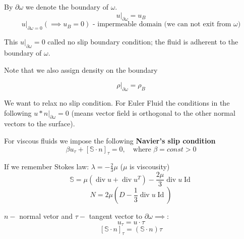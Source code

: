 \documentclass[12pt]{article}
\DeclareMathOperator{\Div}{div}
\DeclareMathOperator{\Id}{Id}
\begin{document}
By $\partial\omega$ we denote the boundary of $\omega$.
$$
    u\vert_{\partial\omega} = u_B
$$
$$
    u\vert_{\partial\omega = 0} (\implies u_B = 0)
    \text{ - impermeable domain (we can not exit from $\omega$)}
$$

This $u\vert_{\partial\omega} = 0$ called no slip boundary condition;
 the fluid is adherent to the boundary of $\omega$.

Note that we also assign density on the boundary

$$
    \rho\vert_{\partial\omega} = \rho_B
$$

We want to relax no slip condition. For Euler Fluid the conditions
in the following $u*n\vert_{\partial\omega} = 0$ (means vector field
is orthogonal to the other normal vectors to the surface).

For viscous fluids we impose the following \textbf{Navier's slip condition}
$$
    \beta u_\tau + \left[ \mathbb{S}\cdot n \right]_\tau = 0,\quad
    \text{where $\beta = const > 0$}
$$

If we remember Stokes law: $\lambda = -\frac{2}{3}\mu$ ($\mu$ is viscousity)
$$
    \mathbb{S} = \mu(\Div u + \Div u^{T})-\dfrac{2\mu}{3}\Div u\Id
$$
$$
    N = 2\mu\left( D - \dfrac{1}{3}\Div u\Id \right) 
$$

$n - $ normal vetor and $\tau - $ tangent vector to $\partial\omega\implies$:
$$
    u_\tau = u\cdot\tau
$$ 
$$
    \left[\mathbb{S}\cdot n\right]_\tau = 
    \left(\mathbb{S}\cdot n\right)\tau
$$
\end{document}
